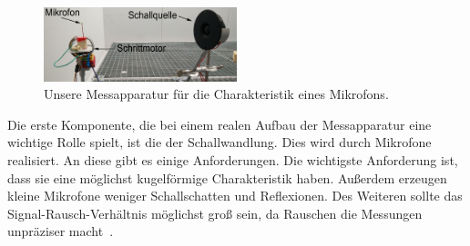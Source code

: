 \begin{figure}
    \centering
    \includegraphics[width=0.5\textwidth]{img/chara_mess}
    \caption{Unsere Messapparatur für die Charakteristik eines Mikrofons.}
\end{figure}
Die erste Komponente, die bei einem realen Aufbau der Messapparatur eine wichtige Rolle spielt, ist die der Schallwandlung. Dies wird durch Mikrofone realisiert. An diese gibt es einige Anforderungen. Die wichtigste Anforderung ist, dass sie eine möglichst kugelförmige Charakteristik haben.
Außerdem erzeugen kleine Mikrofone weniger Schallschatten und Reflexionen. Des Weiteren sollte das Signal-Rausch-Verhältnis möglichst groß sein, da Rauschen die Messungen unpräziser macht~\cite{Rausch}.

